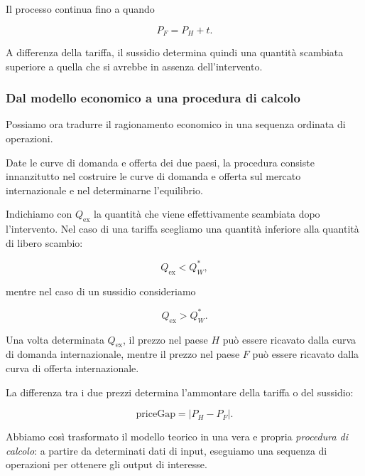 Il processo continua fino a quando

\begin{equation*}
    P_F=P_H+t.
    \label{eq:sussidio-prezzi}
\end{equation*}

A differenza della tariffa, il sussidio determina quindi una
quantità scambiata superiore a quella che si avrebbe in assenza
dell'intervento.


\subsubsection{Dal modello economico a una procedura di calcolo}

Possiamo ora tradurre il ragionamento economico in una sequenza
ordinata di operazioni.

Date le curve di domanda e offerta dei due paesi, la procedura
consiste innanzitutto nel costruire le curve di domanda e offerta
sul mercato internazionale e nel determinarne l'equilibrio.

Indichiamo con $Q_{\mathrm{ex}}$ la quantità che viene effettivamente
scambiata dopo l'intervento. Nel caso di una tariffa scegliamo una
quantità inferiore alla quantità di libero scambio:

\begin{equation*}
    Q_{\mathrm{ex}}<Q_W^*,
\end{equation*}

mentre nel caso di un sussidio consideriamo

\begin{equation*}
    Q_{\mathrm{ex}}>Q_W^*.
\end{equation*}

Una volta determinata $Q_{\mathrm{ex}}$, il prezzo nel paese $H$
può essere ricavato dalla curva di domanda internazionale, mentre
il prezzo nel paese $F$ può essere ricavato dalla curva di offerta
internazionale.

La differenza tra i due prezzi determina l'ammontare della tariffa
o del sussidio:

\begin{equation*}
    \mathrm{priceGap}
    =
    \left|P_H-P_F\right|.
    \label{eq:price-gap}
\end{equation*}

Abbiamo così trasformato il modello teorico in una vera e propria
\emph{procedura di calcolo}: a partire da determinati dati di input,
eseguiamo una sequenza di operazioni per ottenere gli output di
interesse.


